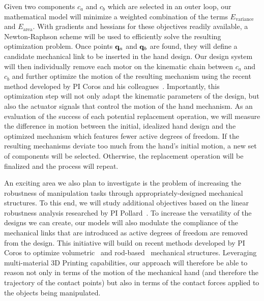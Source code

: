 Given two components $c_a$ and $c_b$ which are selected in an outer loop, our mathematical model will minimize a weighted combination of the terms $E_\mathrm{variance}$ and $E_\mathrm{area}$. With gradients and hessians for these objectives readily available, a Newton-Raphson scheme will be used to efficiently solve the resulting optimization problem. Once points $\mathbf{q}_a$ and $\mathbf{q}_b$ are found, they will define a candidate mechanical link to be inserted in the hand design. Our design system will then individually remove each motor on the kinematic chain between $c_a$ and $c_b$ and further optimize the motion of the resulting mechanism using the recent method developed by PI Coros and his colleagues~\cite{Bacher2015}. Importantly, this optimization step will not only adapt the kinematic parameters of the design, but also the actuator signals that control the motion of the hand mechanism. As an evaluation of the success of each potential replacement operation, we will measure the difference in motion between the initial, idealized hand design and the optimized mechanism which features fewer active degrees of freedom. If the resulting mechanisms deviate too much from the hand's initial motion, a new set of components will be selected. Otherwise, the replacement operation will be finalized and the process will repeat. 

An exciting area we also plan to investigate is the problem of increasing the robustness of manipulation tasks through appropriately-designed mechanical structures. To this end, we will study additional objectives based on the linear robustness analysis researched by PI Pollard~\cite{Pollard:WAFR02,pollard2004closure,pollard20045}. To increase the versatility of the designs we can create, our models will also modulate the compliance of the mechanical links that are introduced as active degrees of freedom are removed from the design. This initiative will build on recent methods developed by PI Coros to optimize volumetric~\cite{Skouras2013} and rod-based~\cite{Jesus2015} mechanical structures. Leveraging multi-material 3D Printing capabilities, our approach will therefore be able to reason not only in terms of the motion of the mechanical hand (and therefore the trajectory of the contact points) but also in terms of the contact forces applied to the objects being manipulated.


